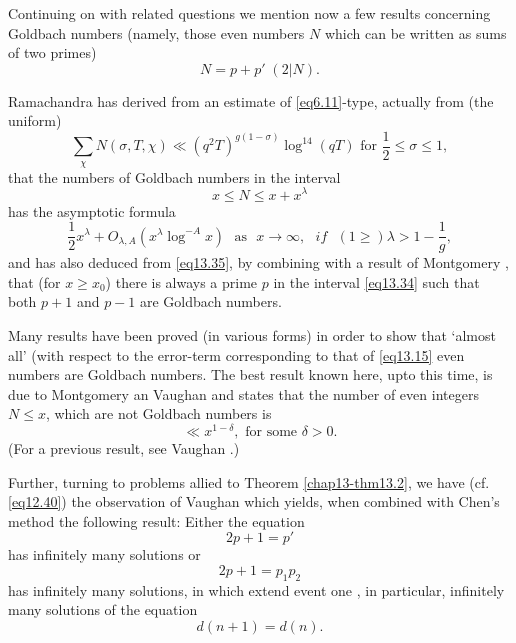 Continuing on with related questions we mention now a few results
concerning Goldbach numbers (namely, those even numbers $N$ which can
be written as sums of two primes) 
\begin{equation*}
N=p+p' \; (2|N).\tag{13.32}\label{eq13.32}
\end{equation*}
  
Ramachandra \cite{key4} has derived from  an estimate of
\eqref{eq6.11}-type, actually from (the uniform)  
\begin{equation*}
\sum_\chi N(\sigma, T,\chi ) \ll (q^2 T)^{g(1-\sigma )} \log^{14} (qT)
\text{ for } \frac{1}{2} \le \sigma \le 1,\tag{13.33}\label{eq13.33} 
\end{equation*}
that the numbers of Goldbach numbers  in the interval 
\begin{equation*}
x \le N \le x+x^{\lambda}\tag{13.34}\label{eq13.34}
\end{equation*}\pageoriginale
has the asymptotic formula 
\begin{equation*}
\frac{1}{2}x^{\lambda}+ O_{\lambda, A} (x^\lambda \log
^{-A}x)\text{~ as~ } x \to \infty, {\textit{~ if~ }} (1 \ge) \lambda > 1 -
\frac{1}{g},\tag{13.35}\label{eq13.35}  
\end{equation*}
and has also deduced from \eqref{eq13.35}, by combining with a result of
Montgomery \cite{key3}, that  (for $x \ge x_0$) there is always a prime $p$
in the interval  \eqref{eq13.34} such that both $p+1$ and $p-1$ are Goldbach
numbers. 

Many results have been proved (in various forms) in order to show that
`almost all' (with respect to the error-term  corresponding to that of
\eqref{eq13.15} even numbers are Goldbach numbers. The best result known
here, upto this time, is due to Montgomery an Vaughan \cite{key3} and states
that the number of even integers $N \le x$, which are not Goldbach
numbers is 
\begin{equation*}
\ll x^{1- \delta}, \text{ for some } \delta >
0.\tag{13.36}\label{eq13.36} 
\end{equation*}  
(For a previous result, see Vaughan \cite{key2}.)
 
Further, turning to problems allied to Theorem \ref{chap13-thm13.2}, we have
(cf. \eqref{eq12.40}) the observation  of Vaughan \cite{key3} which
yields, when combined with Chen's method the following result: Either
the equation  
\begin{equation*}
2p+1=p'\tag{13.37}\label{eq13.37}
\end{equation*}  
has infinitely many solutions or 
\begin{equation*}
2p+1 =p_1p_2\tag{13.38}\label{eq13.38}
\end{equation*}  
has infinitely many solutions, in which  extend event one , in
particular, infinitely many solutions of the equation 
\begin{equation*}
d(n+1)= d(n).\tag{13.39}\label{eq13.39}
\end{equation*}
  
